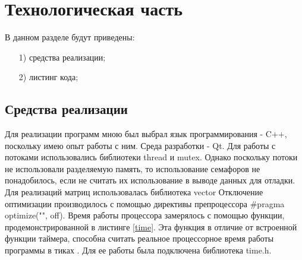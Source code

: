\documentclass[a4paper, 14pt]{article}
\begin{document}
	\newpage
	\section{Технологическая часть}
	\hspace{1cm}В данном разделе будут приведены:
	
    \begin{enumerate}
    \item[1)] средства реализации;
    \item[2)] листинг кода;
    \end{enumerate}

	\subsection{Средства реализации}
	\hspace{1cm}Для реализации программ мною был выбрал язык программирования - C++, поскольку имею опыт работы с ним. 
	Среда разработки - Qt.
	Для работы с потоками использовались библиотеки thread и mutex. Однако поскольку потоки не использовали разделяемую память, то использование семафоров не понадобилось, если не считать их использование в выводе данных для отладки. Для реализаций матриц использовалась библиотека vector
	Отключение оптимизации производилось с помощью директивы препроцессора
	#pragma optimize("", off). 
	Время работы процессора замерялось с помощью функции, продемонстрированной в листинге \ref{time}. Эта функция в отличие от встроенной функции таймера, способна считать реальное процессорное время работы программы в тиках \cite{lom}. Для ее работы была подключена библиотека time.h.
\end{document}
